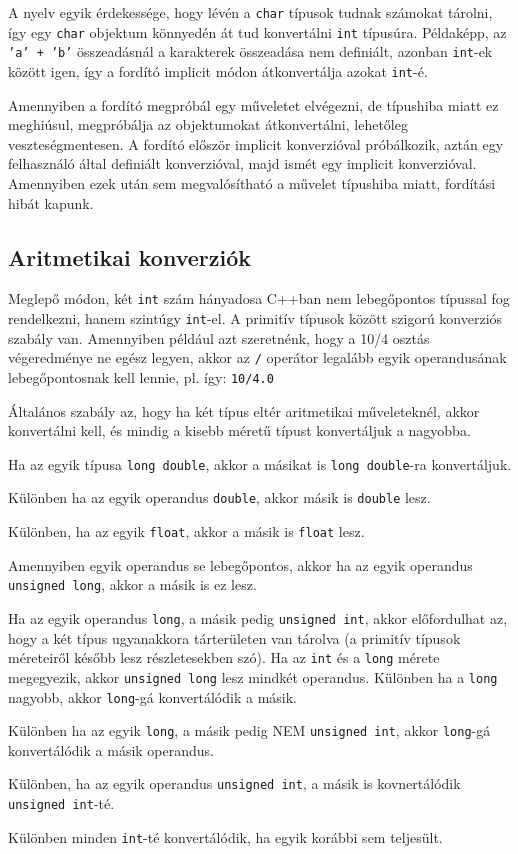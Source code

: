 \documentclass[a4paper,11.5pt,table]{article}
\begin{document}
	A nyelv egyik érdekessége, hogy lévén a \texttt{char} típusok tudnak számokat tárolni, így egy \texttt{char} objektum könnyedén át tud konvertálni \texttt{int} típusúra. Példaképp, az \texttt{'a' + 'b'} összeadásnál a karakterek összeadása nem definiált, azonban \texttt{int}-ek között igen, így a fordító implicit módon átkonvertálja azokat \texttt{int}-é.
	
	Amennyiben a fordító megpróbál egy műveletet elvégezni, de típushiba miatt ez meghiúsul, megpróbálja az objektumokat átkonvertálni, lehetőleg veszteségmentesen. A fordító először implicit konverzióval próbálkozik, aztán egy felhasználó által definiált konverzióval, majd ismét egy implicit konverzióval. Amennyiben ezek után sem megvalósítható a művelet típushiba miatt, fordítási hibát kapunk.
	\subsection{Aritmetikai konverziók}
	Meglepő módon, két \texttt{int} szám hányadosa C++ban nem lebegőpontos típussal fog rendelkezni, hanem szintúgy \texttt{int}-el. A primitív típusok között szigorú konverziós szabály van. Amennyiben például azt szeretnénk, hogy a 10/4 osztás végeredménye ne egész legyen, akkor az \texttt{/} operátor legalább egyik operandusának lebegőpontosnak kell lennie, pl. így: \texttt{10/4.0}
	
	Általános szabály az, hogy ha két típus eltér aritmetikai műveleteknél, akkor konvertálni kell, és mindig a kisebb méretű típust konvertáljuk a nagyobba.
	\begin{compactenum}
		\item Ha az egyik típusa \texttt{long double}, akkor a másikat is \texttt{long double}-ra konvertáljuk.
		\item Különben ha az egyik operandus \texttt{double}, akkor másik is \texttt{double} lesz.
		\item Különben, ha az egyik \texttt{float}, akkor a másik is \texttt{float} lesz.
		\item Amennyiben egyik operandus se lebegőpontos, akkor ha az egyik operandus \texttt{unsigned long}, akkor a másik is ez lesz.
		\item Ha az egyik operandus \texttt{long}, a másik pedig \texttt{unsigned int}, akkor előfordulhat az, hogy a két típus ugyanakkora tárterületen van tárolva (a primitív típusok méreteiről később lesz részletesekben szó). Ha az \texttt{int} és a \texttt{long} mérete megegyezik, akkor \texttt{unsigned
			long} lesz mindkét operandus. Különben ha a \texttt{long} nagyobb, akkor \texttt{long}-gá konvertálódik a másik.
		\item Különben ha az egyik \texttt{long}, a másik pedig NEM \texttt{unsigned int}, akkor \texttt{long}-gá konvertálódik a másik operandus.
		\item Különben, ha az egyik operandus \texttt{unsigned int}, a másik is kovnertálódik \texttt{unsigned int}-té.
		\item Különben minden \texttt{int}-té konvertálódik, ha egyik korábbi sem teljesült.
	\end{compactenum}
\end{document}
